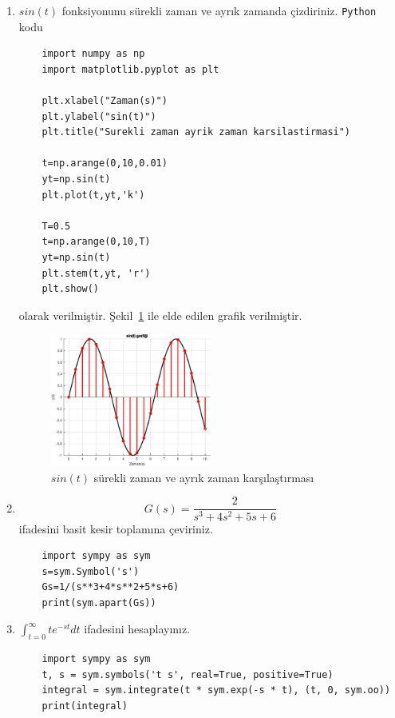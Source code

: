 \begin{enumerate}
\begin{equation}
\begin{split}
                \frac{1}{s}\right\}
                -\frac{1}{2}\mathcal{L}^{-1}\left\{\frac{1}{s+1}\right\}
                +\frac{1}{6}\mathcal{L}^{-1}\left\{\frac{1}{s+3}
            \right\}\\
            y(t)&=\frac{1}{3}\left\{1\right\}-\frac{1}{2}\left\{e^{-t}\right\}+\frac{1}{6}\left\{e^{-3t}
            \right\}\\
            y(t)&=\frac{1}{3}-\frac{1}{2}\left\{e^{-t}\right\}+\frac{1}{6}\left\{e^{-3t}
            \right\}
        \end{split}
    \end{equation}
    elde edilir. 
    
    \item $sin(t)$ fonksiyonunu sürekli zaman ve ayrık zamanda çizdiriniz.
    \verb|Python| kodu
    \begin{lstlisting}
    import numpy as np
    import matplotlib.pyplot as plt 

    plt.xlabel("Zaman(s)")
    plt.ylabel("sin(t)")
    plt.title("Surekli zaman ayrik zaman karsilastirmasi")

    t=np.arange(0,10,0.01)
    yt=np.sin(t)
    plt.plot(t,yt,'k')

    T=0.5
    t=np.arange(0,10,T)
    yt=np.sin(t)
    plt.stem(t,yt, 'r')
    plt.show()
    \end{lstlisting}
    olarak verilmiştir. Şekil~\ref{fig:lec1_plot1} ile elde edilen grafik verilmiştir.
    \begin{figure}[!htb]
        \centering
        \includegraphics[width=0.5\textwidth]{img/lec1_plot1}
        \caption{$sin(t)$ sürekli zaman ve ayrık zaman karşılaştırması}
        \label{fig:lec1_plot1}
    \end{figure}
    
    \item 
    \begin{equation}
        G(s)=\frac{2}{s^3+4s^2+5s+6}
    \end{equation}
    ifadesini basit kesir toplamına çeviriniz.
    \begin{lstlisting}
    import sympy as sym
    s=sym.Symbol('s')
    Gs=1/(s**3+4*s**2+5*s+6)
    print(sym.apart(Gs))
    \end{lstlisting}
    \item $\int_{t=0}^{\infty} te^{-st}dt$ ifadesini hesaplayınız.
    \begin{lstlisting}
    import sympy as sym
    t, s = sym.symbols('t s', real=True, positive=True)
    integral = sym.integrate(t * sym.exp(-s * t), (t, 0, sym.oo))
    print(integral)
    \end{lstlisting}
\end{enumerate}